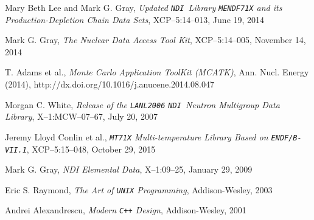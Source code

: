 \documentclass[12pt]{lamemo}
\newcommand{\NDI}{\texttt{NDI}}
\begin{document}
\newpage
\begin{thebibliography}{99}

 Mary Beth Lee and Mark G. Gray, \emph{Updated
  \NDI\ Library \texttt{MENDF71X} and its Production-Depletion Chain
  Data Sets}, XCP--5:14--013, June 19, 2014
  
 Mark G. Gray, \emph{The Nuclear Data Access Tool
  Kit}, XCP--5:14--005, November 14, 2014

 T. Adams et al., \emph{Monte Carlo Application
  ToolKit (MCATK)}, Ann. Nucl. Energy (2014),
  http://dx.doi.org/10.1016/j.anucene.2014.08.047

 Morgan C. White, \emph{Release of the
  \texttt{LANL2006} \NDI\ Neutron Multigroup Data Library},
  X--1:MCW--07--67, July 20, 2007
  
 Jeremy Lloyd Conlin et al., \emph{\texttt{MT71X}
  Multi-temperature Library Based on \texttt{ENDF/B-VII.1}},
  XCP--5:15--048, October 29, 2015

 Mark G. Gray, \emph{NDI Elemental Data},
  X--1:09--25, January 29, 2009
  
 Eric S. Raymond, \emph{The Art of \texttt{UNIX}
  Programming}, Addison-Wesley, 2003

 Andrei Alexandrescu, \emph{Modern
  \texttt{C++} Design}, Addison-Wesley, 2001

\end{thebibliography}
\end{document}
